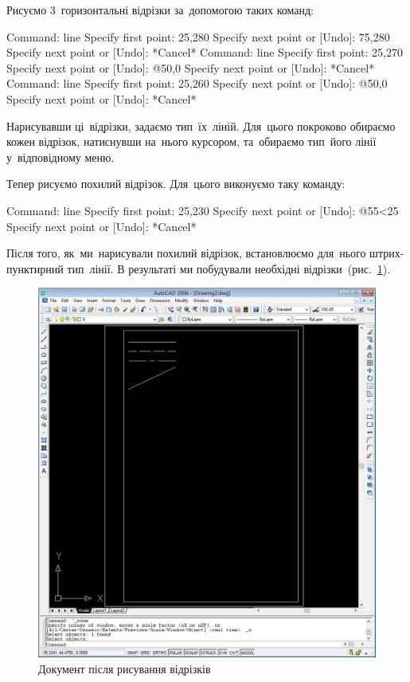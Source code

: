 \documentclass[
	a4paper,
	oneside,
	BCOR = 10mm,
	DIV = 12,
	12pt,
	headings = normal,
]{scrartcl}
\begin{document}
			Рисуємо 3~горизонтальні відрізки за~допомогою таких команд:
			\begin{codegeneric}
				Command: line
				Specify first point: 25,280
				Specify next point or [Undo]: 75,280
				Specify next point or [Undo]: *Cancel*
				Command: line
				Specify first point: 25,270
				Specify next point or [Undo]: @50,0
				Specify next point or [Undo]: *Cancel*
				Command: line
				Specify first point: 25,260
				Specify next point or [Undo]: @50,0
				Specify next point or [Undo]: *Cancel*
			\end{codegeneric}
			Нарисувавши ці~відрізки, задаємо тип~їх~ліній. Для~цього покроково обираємо кожен відрізок, натиснувши на~нього курсором, та~обираємо тип~його лінії у~відповідному меню.

			Тепер рисуємо похилий відрізок. Для~цього виконуємо таку команду:
			\begin{codegeneric}
				Command: line
				Specify first point: 25,230
				Specify next point or [Undo]: @55<25
				Specify next point or [Undo]: *Cancel*
			\end{codegeneric}
			Після того, як~ми~нарисували похилий відрізок, встановлюємо для~нього штрих-пунктирний тип~лінії. В результаті ми побудували необхідні відрізки~(рис.~\ref{fig:03-lines}).

			\begin{figure}[!htbp]
				\centering
				\includegraphics[height=18\baselineskip]{./assets/y04s01-csdt-lab-01-01-p05.png}
				\caption{Документ після рисування відрізків}
				\label{fig:03-lines}
			\end{figure}
\end{document}
